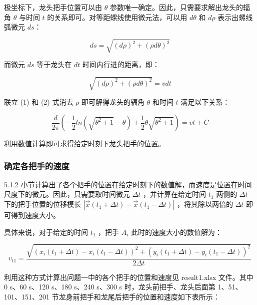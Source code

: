 \documentclass[a4paper]{article}
\begin{document}
		极坐标下，龙头把手位置可以由 $\theta$ 参数唯一确定。因此，只需要求解出龙头的辐角 $\theta$ 与时间 $t$ 的关系即可。对等距螺线使用微元法，可以用 $d\theta$ 和 $d\rho$ 表示出螺线弧微元 $ds$：
	
		$$ ds = \sqrt{(d\rho)^2 + (\rho d\theta) ^ 2}$$
		
		而微元 $ds$ 等于龙头在 $dt$ 时间内行进的距离，即：
		
		\begin{equation}
			\sqrt{(d\rho)^2 + (\rho d\theta) ^ 2} = vdt
		\end{equation}
		
		联立 (1) 和 (2) 式消去 $\rho$ 即可解得龙头的辐角 $\theta$ 和时间 $t$ 满足以下关系：
		
		\begin{equation}
			\frac{d}{2\pi}(-\frac{1}{2}ln(\sqrt{\theta^2+1}-\theta)+\frac{1}{2}\theta\sqrt{\theta^2+1})=vt+C
		\end{equation}
		
		利用数值计算即可求得给定时刻下龙头把手的位置。
	
	\subsubsection{确定各把手的速度}
		
		5.1.2 小节计算出了各个把手的位置在给定时刻下的数值解，而速度是位置在时间尺度下的微元。因此，只需要取时间微元 $\Delta t$ ，并计算在给定时间 $t_1$ 两侧的 $\Delta t$ 下的把手位置的位移模长 $|\vec{x}(t_1+\Delta t) - \vec{x}(t_1 - \Delta t)|$ ，将其除以两倍的 $\Delta t$ 即可得到速度大小。
		
		
		
		具体来说，对于给定的时间 $t_1$ ，把手 $A_i$ 此时的速度大小的数值解为：
		
		\begin{equation}
			v_{t1} = \frac{\sqrt{(x_i(t_1 + \Delta t) - x_i(t_1 - \Delta t))^2 + (y_i(t_1 + \Delta t) - y_i(t_1 - \Delta t))^2}}{2\Delta t}
		\end{equation}
		
		
		利用这种方式计算出问题一中的各个把手的位置和速度见 result1.xlsx 文件。其中 0 s、60 s、120 s、180 s、240 s、300 s 时，龙头前把手、龙头后面第 1、51、101、151、201 节龙身前把手和龙尾后把手的位置和速度如下表所示：
		
\end{document}
